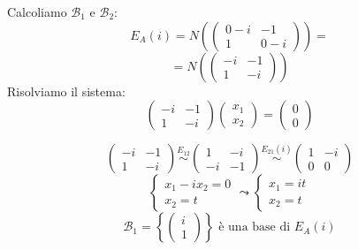 \documentclass[a4paper]{article}
\theoremstyle{break}
\theoremstyle{break}
\theoremstyle{break}
\theoremstyle{break}
\begin{document}
\begin{example}
\begin{itemize}
      \vspace{1em}
      \noindent Calcoliamo \( \mathcal{B}_1 \) e \( \mathcal{B}_2 \):
      \[
      E_A(i) = N \left( 
        \begin{pmatrix} 
          0 - i & -1\\
          1 & 0 - i
        \end{pmatrix} 
      \right) 
      =
      \] 
      \[
      = N \left( 
        \begin{pmatrix} 
          -i & -1\\
          1 & -i
        \end{pmatrix} 
      \right) 
      \] 
      Risolviamo il sistema:
      \[
      \begin{pmatrix} 
        -i & -1\\
        1 & -i
      \end{pmatrix} 
      \begin{pmatrix} 
        x_1\\
        x_2
      \end{pmatrix} 
      =
      \begin{pmatrix} 
        0\\
        0
      \end{pmatrix} 
      \] 

      \[
      \begin{pmatrix} 
        -i & -1\\
        1 & -i
      \end{pmatrix} 
      \stackrel{E_{12}}{\sim}
      \begin{pmatrix} 
        1 & -i\\
        -i & -1
      \end{pmatrix}
      \stackrel{E_{21}(i)}{\sim}
      \begin{pmatrix} 
        1 & -i\\
        0 & 0
      \end{pmatrix} 
      \] 
      \[
      \begin{cases}
        x_1 - ix_2 = 0\\
        x_2 = t
      \end{cases}
      \leadsto
      \begin{cases}
        x_1 = it\\
        x_2 = t
      \end{cases}
      \] 
      \[
      \mathcal{B}_1 = \left\{ \begin{pmatrix} i\\1 \end{pmatrix}  \right\} 
      \text{ è una base di } E_A(i)
      \] 


\end{itemize}
\end{example}
\end{document}
